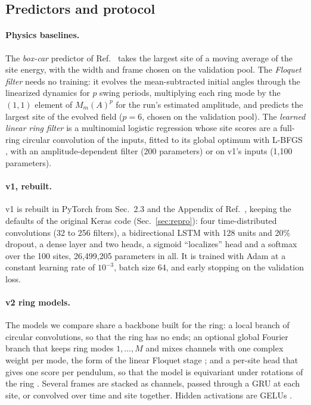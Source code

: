 \documentclass[11pt]{article}
\begin{document}
\subsection{Predictors and protocol}
\label{sec:predictors}

\paragraph{Physics baselines.} The \emph{box-car} predictor of Ref.~\cite{mittal2026jand} takes the largest site of a moving average of the site energy, with the width and frame chosen on the validation pool. The \emph{Floquet filter} needs no training: it evolves the mean-subtracted initial angles through the linearized dynamics for $p$ swing periods, multiplying each ring mode by the $(1,1)$ element of $M_m(A)^p$ for the run's estimated amplitude, and predicts the largest site of the evolved field ($p=6$, chosen on the validation pool). The \emph{learned linear ring filter} is a multinomial logistic regression whose site scores are a full-ring circular convolution of the inputs, fitted to its global optimum with L-BFGS \cite{liu1989limited}, with an amplitude-dependent filter (200 parameters) or on v1's inputs (1,100 parameters).

\paragraph{v1, rebuilt.} v1 is rebuilt in PyTorch \cite{paszke2019pytorch} from Sec.~2.3 and the Appendix of Ref.~\cite{mittal2026jand}, keeping the defaults of the original Keras code (Sec.~\ref{sec:repro}): four time-distributed convolutions (32 to 256 filters), a bidirectional LSTM with 128 units and 20\% dropout, a dense layer and two heads, a sigmoid ``localizes'' head and a softmax over the 100 sites, 26,499,205 parameters in all. It is trained with Adam \cite{kingma2015adam} at a constant learning rate of $10^{-3}$, batch size 64, and early stopping on the validation loss.

\paragraph{v2 ring models.} The models we compare share a backbone built for the ring: a local branch of circular convolutions, so that the ring has no ends; an optional global Fourier branch that keeps ring modes $1,\dots,M$ and mixes channels with one complex weight per mode, the form of the linear Floquet stage \cite{li2021fourier}; and a per-site head that gives one score per pendulum, so that the model is equivariant under rotations of the ring \cite{cohen2016group}. Several frames are stacked as channels, passed through a GRU \cite{cho2014learning} at each site, or convolved over time and site together. Hidden activations are GELUs \cite{hendrycks2016gelu}.
\end{document}
